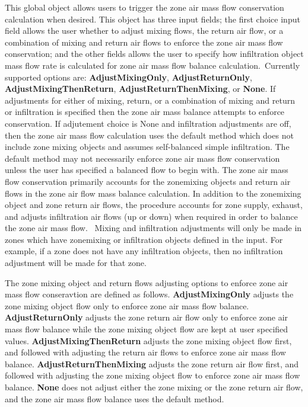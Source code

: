This global object allows users to trigger the zone air mass flow conservation calculation when desired. This object has three input fields; the first choice input field allows the user whether to adjust mixing flows, the return air flow, or a combination of mixing and return air flows to enforce the zone air mass flow conservation; and the other fields allows the user to specify how infiltration object mass flow rate is calculated for zone air mass flow balance calculation.~Currently supported options are: \textbf{AdjustMixingOnly}, \textbf{AdjustReturnOnly}, \textbf{AdjustMixingThenReturn}, \textbf{AdjustReturnThenMixing}, or \textbf{None}. If adjustments for either of mixing, return, or a combination of mixing and return or infiltration is specified then the zone air mass balance attempts to enforce conservation. If adjutement choice is None and infiltration adjustments are off, then the zone air mass flow calculation uses the default method which does not include zone mixing objects and assumes self-balanced simple infiltration. The default method may not necessarily enforce zone air mass flow conservation unless the user has specified a balanced flow to begin with. The zone air mass flow conservation primarily accounts for the zonemixing objects and return air flows in the zone air flow mass balance calculation. In addition to the zonemixing object and zone return air flows, the procedure accounts for zone supply, exhaust, and adjusts infiltration air flows (up or down) when required in order to balance the zone air mass flow.~ Mixing and infiltration adjustments will only be made in zones which have zonemixing or infiltration objects defined in the input. For example, if a zone does not have any infiltration objects, then no infiltration adjustment will be made for that zone. 

The zone mixing object and return flows adjusting options to enforce zone air mass flow conseravtion are defined as follows. \textbf{AdjustMixingOnly} adjusts the zone mixing object flow only to enforce zone air mass flow balance. \textbf{AdjustReturnOnly} adjusts the zone return air flow only to enforce zone air mass flow balance while the zone mixing object flow are kept at user specified values. \textbf{AdjustMixingThenReturn} adjusts the zone mixing object flow first, and followed with adjusting the return air flows to enforce zone air mass flow balance. \textbf{AdjustReturnThenMixing} adjusts the zone return air flow first, and followed with adjusting the zone mixing object flow to enforce zone air mass flow balance. \textbf{None} does not adjust either the zone mixing or the zone return air flow, and the zone air mass flow balance uses the default method. 
 
